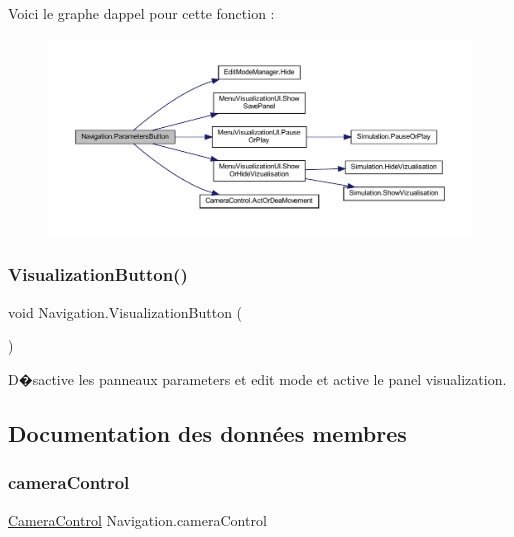 Voici le graphe d\textquotesingle{}appel pour cette fonction \+:
\nopagebreak
\begin{figure}[H]
\begin{center}
\leavevmode
\includegraphics[width=350pt]{class_navigation_adf000d0931e06c79e1e66f266d93e313_cgraph}
\end{center}
\end{figure}
\mbox{\label{class_navigation_ad4dbf103497aef10cc636c40f84dbdde}} 
\subsubsection{\texorpdfstring{Visualization\+Button()}{VisualizationButton()}}
{\footnotesize\ttfamily void Navigation.\+Visualization\+Button (\begin{DoxyParamCaption}{ }\end{DoxyParamCaption})\hspace{0.3cm}{\ttfamily [inline]}}



D�sactive les panneaux parameters et edit mode et active le panel visualization. 



\subsection{Documentation des données membres}
\mbox{\label{class_navigation_a8ee62aef67edcc54d1478d20c22fff12}} 
\subsubsection{\texorpdfstring{camera\+Control}{cameraControl}}
{\footnotesize\ttfamily \mbox{\hyperlink{class_camera_control}{Camera\+Control}} Navigation.\+camera\+Control}



